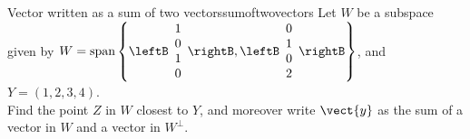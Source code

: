 \begin{example}{Vector written as a sum of two vectors}{sumoftwovectors}
Let $W$ be a subspace given by $W = \mbox{span} \left\{
\leftB
\begin{array}{c}
1 \\
0 \\
1 \\
0 \\
\end{array}
\rightB, 
\leftB 
\begin{array}{c}
0 \\
1 \\
0 \\
2 \\
\end{array}
\rightB
\right\}$, and $Y = (1,2,3,4)$. \\
Find the point $Z$ in $W$ closest to $Y$, and moreover write $\vect{y}$ as the sum of a  vector in $W$ and a vector in $W^{\perp}$. 
\end{example}

